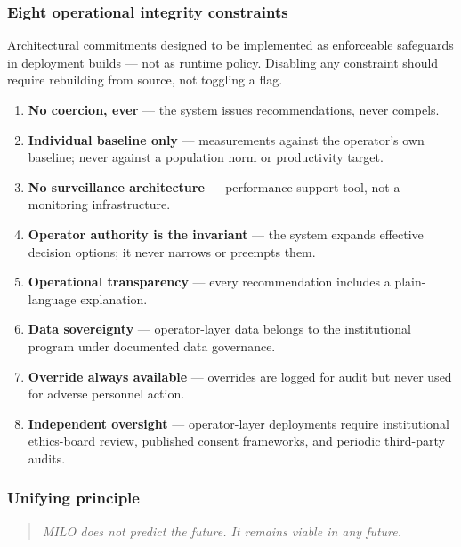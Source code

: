 \subsubsection{Eight operational integrity
constraints}\label{eight-operational-integrity-constraints}

Architectural commitments designed to be implemented as enforceable
safeguards in deployment builds --- not as runtime policy. Disabling any
constraint should require rebuilding from source, not toggling a flag.

\begin{enumerate}
\def\labelenumi{\arabic{enumi}.}
\tightlist
\item
  \textbf{No coercion, ever} --- the system issues recommendations,
  never compels.
\item
  \textbf{Individual baseline only} --- measurements against the
  operator's own baseline; never against a population norm or
  productivity target.
\item
  \textbf{No surveillance architecture} --- performance-support tool,
  not a monitoring infrastructure.
\item
  \textbf{Operator authority is the invariant} --- the system expands
  effective decision options; it never narrows or preempts them.
\item
  \textbf{Operational transparency} --- every recommendation includes a
  plain-language explanation.
\item
  \textbf{Data sovereignty} --- operator-layer data belongs to the
  institutional program under documented data governance.
\item
  \textbf{Override always available} --- overrides are logged for audit
  but never used for adverse personnel action.
\item
  \textbf{Independent oversight} --- operator-layer deployments require
  institutional ethics-board review, published consent frameworks, and
  periodic third-party audits.
\end{enumerate}

\subsubsection{Unifying principle}\label{unifying-principle}

\begin{quote}
\emph{MILO does not predict the future. It remains viable in any
future.}
\end{quote}

